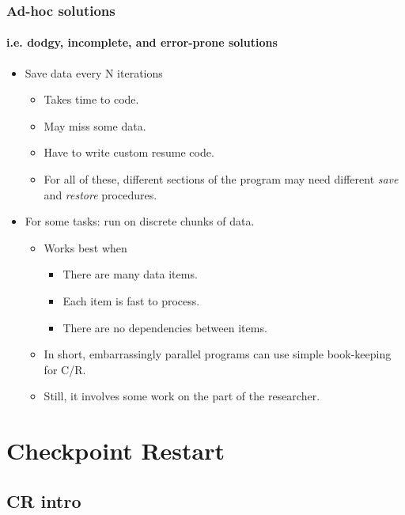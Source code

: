 \documentclass[compress]{beamer}
\begin{document}
\begin{frame}
\frametitle{Ad-hoc solutions}
\framesubtitle{i.e. dodgy, incomplete, and error-prone solutions}

\begin{itemize}
\item{Save data every N iterations}
  \begin{itemize}
  \item{Takes time to code.}
  \item{May miss some data.}
  \item{Have to write custom resume code.}
  \item{For all of these, different sections of the program may need
    different \textit{save} and \textit{restore} procedures.}
  \end{itemize}  
  \item{For some tasks: run on discrete chunks of data.}
    \begin{itemize}
    \item{Works best when}
      \begin{itemize}
      \item{There are many data items.}
      \item{Each item is fast to process.}
      \item{There are no dependencies between items.}
      \end{itemize}
    \item{In short, embarrassingly parallel programs can use simple book-keeping for C/R}.
    \item{Still, it involves some work on the part of the researcher.}
  \end{itemize}
\end{itemize}

\end{frame}


\section{Checkpoint Restart}  %

\subsection{CR intro}         %
\end{document}
